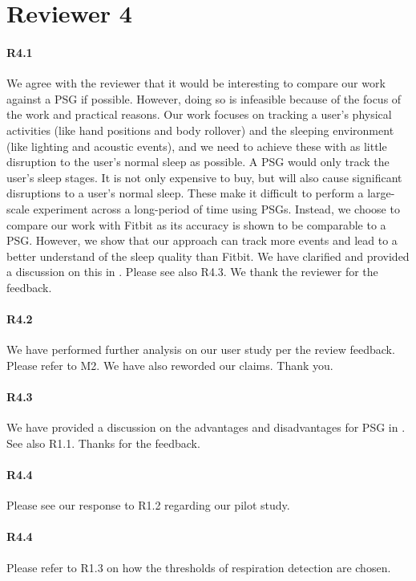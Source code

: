 \section*{Reviewer 4}

\paragraph{R4.1} We agree with the reviewer that it would be interesting to compare our work against a PSG if possible. However, doing so
is infeasible because of the focus of the work and practical reasons. Our work focuses on tracking a user's physical activities (like hand
positions and body rollover) and the sleeping environment (like lighting and acoustic events), and we need to achieve these with as little
disruption to the user's normal sleep as possible. A PSG would only track the user's sleep stages. It is not only expensive to buy, but
will also cause significant disruptions to a user's normal sleep. These make it difficult to perform a large-scale experiment across a
long-period of time using PSGs. Instead, we choose to compare our work with Fitbit as its accuracy is shown to be comparable to a PSG.
However, we show that our approach can track more events and lead to a better understand of the sleep quality than Fitbit. We have
clarified and provided a discussion on this in . Please see also R4.3. We thank the reviewer for the feedback.

\paragraph{R4.2} We have performed further analysis on our user study per the review feedback. Please refer to M2. We have also reworded our
claims. Thank you.


\paragraph{R4.3} We have provided a discussion on the advantages and disadvantages for PSG in . See also R1.1. Thanks for the feedback.

\paragraph{R4.4} Please see our response to R1.2 regarding our pilot study.

\paragraph{R4.4} Please refer to R1.3 on how the thresholds of respiration detection are chosen.

